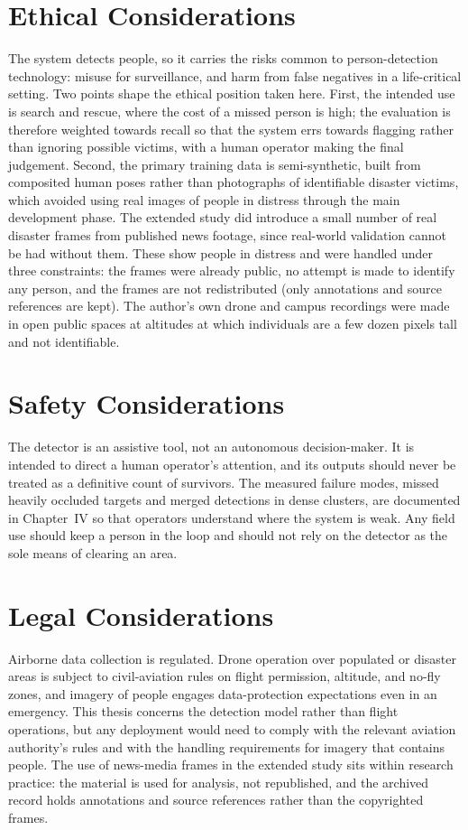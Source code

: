\section{Ethical Considerations}
The system detects people, so it carries the risks common to person-detection
technology: misuse for surveillance, and harm from false negatives in a
life-critical setting. Two points shape the ethical position taken here. First, the
intended use is search and rescue, where the cost of a missed person is high; the
evaluation is therefore weighted towards recall so that the system errs towards
flagging rather than ignoring possible victims, with a human operator making the
final judgement. Second, the primary training data is semi-synthetic, built from
composited human poses rather than photographs of identifiable disaster victims,
which avoided using real images of people in distress through the main
development phase. The extended study did introduce a small number of real
disaster frames from published news footage, since real-world validation cannot
be had without them. These show people in distress and were handled under three
constraints: the frames were already public, no attempt is made to identify any
person, and the frames are not redistributed (only annotations and source
references are kept). The author's own drone and campus recordings were made in
open public spaces at altitudes at which individuals are a few dozen pixels tall
and not identifiable.

\section{Safety Considerations}
The detector is an assistive tool, not an autonomous decision-maker. It is intended
to direct a human operator's attention, and its outputs should never be treated as
a definitive count of survivors. The measured failure modes, missed heavily
occluded targets and merged detections in dense clusters, are documented in
Chapter~IV so that operators understand where the system is weak. Any field use
should keep a person in the loop and should not rely on the detector as the sole
means of clearing an area.

\section{Legal Considerations}
Airborne data collection is regulated. Drone operation over populated or disaster
areas is subject to civil-aviation rules on flight permission, altitude, and
no-fly zones, and imagery of people engages data-protection expectations even in an
emergency. This thesis concerns the detection model rather than flight operations,
but any deployment would need to comply with the relevant aviation authority's
rules and with the handling requirements for imagery that contains people. The
use of news-media frames in the extended study sits within research practice:
the material is used for analysis, not republished, and the archived record
holds annotations and source references rather than the copyrighted frames.

